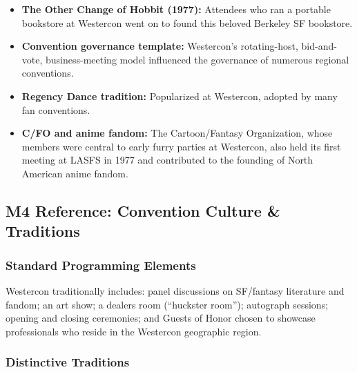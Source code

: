 \documentclass[11pt,letterpaper]{article}
\begin{document}
\begin{itemize}[leftmargin=2em]
  \item \textbf{The Other Change of Hobbit (1977):} Attendees who ran a portable bookstore at Westercon went on to found this beloved Berkeley SF bookstore.
  \item \textbf{Convention governance template:} Westercon's rotating-host, bid-and-vote, business-meeting model influenced the governance of numerous regional conventions.
  \item \textbf{Regency Dance tradition:} Popularized at Westercon, adopted by many fan conventions.
  \item \textbf{C/FO and anime fandom:} The Cartoon/Fantasy Organization, whose members were central to early furry parties at Westercon, also held its first meeting at LASFS in 1977 and contributed to the founding of North American anime fandom.
\end{itemize}

\subsection{M4 Reference: Convention Culture \& Traditions}

\subsubsection{Standard Programming Elements}

Westercon traditionally includes: panel discussions on SF/fantasy literature and fandom; an art show; a dealers room (``huckster room''); autograph sessions; opening and closing ceremonies; and Guests of Honor chosen to showcase professionals who reside in the Westercon geographic region.

\subsubsection{Distinctive Traditions}
\end{document}
